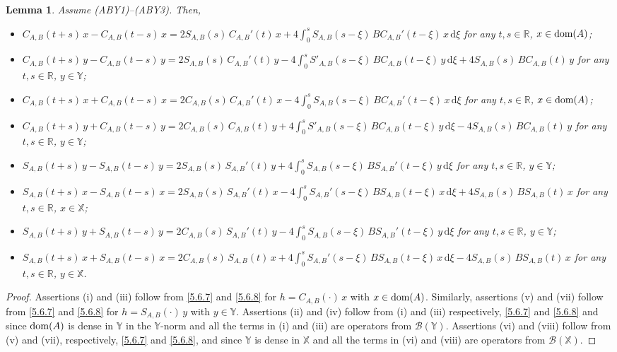 \documentclass[11pt]{amsart}
\numberwithin{equation}{section}
\newcommand{\rmd}{{\mathrm{d}}}
\newtheorem{lemma}[theorem]{Lemma}
\theoremstyle{remark}
\theoremstyle{definition}
\newcommand\bX{{\mathbb X}}
\newcommand\bY{{\mathbb Y}}
\newcommand{\dom}{\text{\rm{dom}}}
\begin{document}
\begin{lemma}\label{l5.6}
	Assume \textnormal{(ABY1)--(ABY3)}. Then,
	\begin{itemize}
		\item[(i)] $C_{A,B}(t+s)\,x - C_{A,B}(t-s)\,x = 2S_{A,B}(s)\,C_{A,B}'(t)\,x + 4\displaystyle\int_0^s S_{A,B}(s-\xi)\,BC_{A,B}'(t-\xi)\,x\,\rmd\xi$
		for any $t, s \in \mathbb{R}$, $x \in \dom(A)$;
		\item[(ii)] $C_{A,B}(t+s)\,y - C_{A,B}(t-s)\,y = 2S_{A,B}(s)\,C_{A,B}'(t)\,y- 4\displaystyle\int_0^s S'_{A,B}(s-\xi)\,BC_{A,B}(t-\xi)\,y\,\rmd\xi+ 4S_{A,B}(s)\,BC_{A,B}(t)\,y $
		for any $t, s \in \mathbb{R}$, $y \in \bY$;
		\item[(iii)] $C_{A,B}(t+s)\,x + C_{A,B}(t-s)\,x = 2C_{A,B}(s)\,C_{A,B}'(t)\,x - 4\displaystyle\int_0^s S_{A,B}(s-\xi)\,BC_{A,B}'(t-\xi)\,x\,\rmd\xi$
		for any $t, s \in \mathbb{R}$, $x \in \dom(A)$;
		\item[(iv)] $C_{A,B}(t+s)\,y + C_{A,B}(t-s)\,y = 2C_{A,B}(s)\,C_{A,B}(t)\,y+ 4\displaystyle\int_0^s S'_{A,B}(s-\xi)\,BC_{A,B}(t-\xi)\,y\,\rmd\xi- 4S_{A,B}(s)\,BC_{A,B}(t)\,y$
		for any $t, s \in \mathbb{R}$, $y \in \bY$;
		\item[(v)] $S_{A,B}(t+s)\,y - S_{A,B}(t-s)\,y = 2S_{A,B}(s)\,S_{A,B}'(t)\,y + 4\displaystyle\int_0^s S_{A,B}(s-\xi)\,BS_{A,B}'(t-\xi)\,y\,\rmd\xi$
		for any $t, s \in \mathbb{R}$, $y \in \bY$;
		\item[(vi)] $S_{A,B}(t+s)\,x - S_{A,B}(t-s)\,x = 2S_{A,B}(s)\,S_{A,B}'(t)\,x - 4\displaystyle\int_0^s S_{A,B}'(s-\xi)\,BS_{A,B}(t-\xi)\,x\,\rmd\xi+4S_{A,B}(s)\,BS_{A,B}(t)\,x $
		for any $t, s \in \mathbb{R}$, $x \in \bX$;
		\item[(vii)] $S_{A,B}(t+s)\,y + S_{A,B}(t-s)\,y = 2C_{A,B}(s)\,S_{A,B}'(t)\,y - 4\displaystyle\int_0^s S_{A,B}(s-\xi)\,BS_{A,B}'(t-\xi)\,y\,\rmd\xi$
		for any $t, s \in \mathbb{R}$, $y \in \bY$;
		\item[(viii)] $S_{A,B}(t+s)\,x + S_{A,B}(t-s)\,x = 2C_{A,B}(s)\,S_{A,B}(t)\,x + 4\displaystyle\int_0^s S_{A,B}'(s-\xi)\,BS_{A,B}(t-\xi)\,x\,\rmd\xi- 4S_{A,B}(s)\,BS_{A,B}(t)\,x  $ for any $t, s \in \mathbb{R}$, $y \in \bX$.
	\end{itemize}
\end{lemma}
\begin{proof}
	Assertions (i) and (iii) follow from \eqref{5.6.7} and \eqref{5.6.8} for $h = C_{A,B}(\cdot)\,x$ with $x \in \dom(A)$. Similarly, assertions (v) and (vii) follow from \eqref{5.6.7} and \eqref{5.6.8} for $h = S_{A,B}(\cdot)\,y$ with $y \in\bY$. Assertions (ii) and (iv) follow from (i) and (iii) respectively, \eqref{5.6.7} and \eqref{5.6.8} and since $\dom(A)$ is dense in $\bY$ in the $\bY$-norm and all the terms in (i) and (iii) are operators from $\mathcal{B}(\bY)$. Assertions (vi) and (viii) follow from (v) and (vii), respectively, \eqref{5.6.7} and \eqref{5.6.8}, and since $\bY$ is dense in $\bX$ and all the terms in (vi) and (viii) are operators from $\mathcal{B}(\bX)$.
\end{proof}
\end{document}
